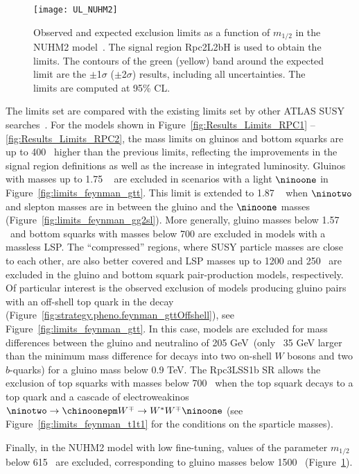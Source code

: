 \begin{figure}[htb!]
\centering
\texttt{[image: UL\_NUHM2]}\label{fig:limits_feynman_nuhm2}
\caption{Observed and expected exclusion limits as a function of $m_{1/2}$ in the NUHM2 model~\cite{Ellis:2002iu,Ellis:2002wv}.
The signal region Rpc2L2bH is used to obtain the limits. 
The contours of the green (yellow) band around the expected limit are the $\pm$1$\sigma$ ($\pm$2$\sigma$) results, including all uncertainties. The limits are computed at 95\% CL.}
\label{fig:Results_Limits_NUHM2} 
\end{figure} 

The limits set are compared with the existing limits set by other ATLAS SUSY 
searches~\cite{paperSS3L,Aad:2016jxj}. For the models shown in Figure~\ref{fig:Results_Limits_RPC1} -- \ref{fig:Results_Limits_RPC2}, 
the mass limits on gluinos and bottom squarks are up to 400 \GeV~higher than the previous limits, reflecting the improvements 
in the signal region definitions as well as the increase in integrated luminosity. Gluinos with masses up to 1.75 \TeV~
are excluded in scenarios with a light $\ninoone$ in Figure~\ref{fig:limits_feynman_gtt}. This limit is extended to 1.87 \TeV~ when 
$\ninotwo$ and slepton masses are in between the gluino and the $\ninoone$ masses (Figure~\ref{fig:limits_feynman_gg2sl}). More generally, gluino masses 
below 1.57 \TeV~and bottom squarks with masses below 700 \GeV
are excluded in models with a massless LSP. The ``compressed'' regions, where SUSY particle masses are close to each other, are also better covered 
and LSP masses up to 1200 and 250 \GeV~are excluded in the gluino and bottom squark pair-production models, respectively. Of particular
interest is the observed exclusion of models producing gluino pairs with an off-shell top quark in the decay (Figure~\ref{fig:strategy.pheno.feynman_gttOffshell}), 
see Figure~\ref{fig:limits_feynman_gtt}. In this case, models are excluded for mass differences between the gluino and neutralino of 205 GeV~(only ~35 GeV
larger than the minimum mass difference for decays into two on-shell $W$ bosons and two $b$-quarks) for a gluino mass below 0.9
TeV. The Rpc3LSS1b SR allows the exclusion of top squarks with masses below 700 \GeV~when the top squark decays to a top quark and a cascade of electroweakinos 
$\ninotwo \to \chinoonepm W^{\mp} \to W^{*} W^{\mp} \ninoone$ (see Figure~\ref{fig:limits_feynman_t1t1} for the conditions 
on the sparticle masses).


Finally, in the NUHM2 model with low fine-tuning, values of the parameter $m_{1/2}$ below 615 \GeV~are excluded, 
corresponding to gluino masses below 1500 \GeV~(Figure~\ref{fig:Results_Limits_NUHM2}).
